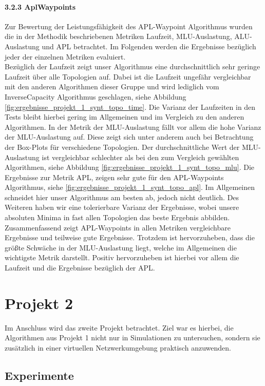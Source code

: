 \documentclass[sigconf,nonacm,review,language=english,language=german]{acmart}
\begin{document}
        \paragraph{3.2.3   AplWaypoints}
            Zur Bewertung der Leistungsfähigkeit des APL-Waypoint Algorithmus wurden die in der Methodik beschriebenen Metriken Laufzeit, MLU-Auslastung, ALU-Auslastung und APL betrachtet. Im Folgenden werden die Ergebnisse bezüglich jeder der einzelnen Metriken evaluiert. \\
            Bezüglich der Laufzeit zeigt unser Algorithmus eine durchschnittlich sehr geringe Laufzeit über alle Topologien auf. Dabei ist die Laufzeit ungefähr vergleichbar mit den anderen Algorithmen dieser Gruppe und wird lediglich vom InverseCapacity Algorithmus geschlagen, siehe Abbildung \ref{fig:ergebnisse_projekt_1_synt_topo_time}. Die Varianz der Laufzeiten in den Tests bleibt hierbei gering im Allgemeinen und im Vergleich zu den anderen Algorithmen.
            In der Metrik der MLU-Auslastung fällt vor allem die hohe Varianz der MLU-Auslastung auf. Diese zeigt sich unter anderem auch bei Betrachtung der Box-Plots für verschiedene Topologien. Der durchschnittliche Wert der MLU-Auslastung ist vergleichbar schlechter als bei den zum Vergleich gewählten Algorithmen, siehe Abbildung \ref{fig:ergebnisse_projekt_1_synt_topo_mlu}.
            Die Ergebnisse zur Metrik APL, zeigen sehr gute für den APL-Waypoints Algorithmus, siehe \ref{fig:ergebnisse_projekt_1_synt_topo_apl}. Im Allgemeinen schneidet hier unser Algorithmus am besten ab, jedoch nicht deutlich. Des Weiteren haben wir eine tolerierbare Varianz der Ergebnisse, wobei unsere absoluten Minima in fast allen Topologien das beste Ergebnis abbilden.
            Zusammenfassend zeigt APL-Waypoints in allen Metriken vergleichbare Ergebnisse und teilweise gute Ergebnisse. Trotzdem ist hervorzuheben, dass die größte Schwäche in der MLU-Auslastung liegt, welche im Allgemeinen die wichtigste Metrik darstellt. Positiv hervorzuheben ist hierbei vor allem die Laufzeit und die Ergebnisse bezüglich der APL.


\section{Projekt 2}
    Im Anschluss wird das zweite Projekt betrachtet. Ziel war es hierbei, die Algorithmen aus Projekt 1 nicht nur in Simulationen zu untersuchen, sondern sie zusätzlich in einer virtuellen Netzwerkumgebung praktisch anzuwenden.
    
    \subsection{Experimente}
\end{document}
